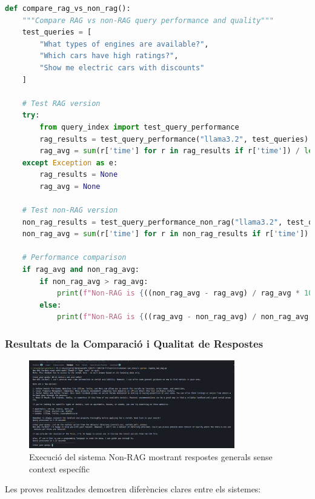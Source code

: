 \documentclass[12pt,a4paper]{article}
\begin{document}
\begin{lstlisting}[language=Python,caption=Funció de comparació automàtica]
def compare_rag_vs_non_rag():
    """Compare RAG vs non-RAG query performance and quality"""
    test_queries = [
        "What types of engines are available?",
        "Which cars have high ratings?",
        "Show me electric cars with discounts"
    ]
    
    # Test RAG version
    try:
        from query_index import test_query_performance
        rag_results = test_query_performance("llama3.2", test_queries)
        rag_avg = sum(r['time'] for r in rag_results if r['time']) / len([r for r in rag_results if r['time']])
    except Exception as e:
        rag_results = None
        rag_avg = None
    
    # Test non-RAG version
    non_rag_results = test_query_performance_non_rag("llama3.2", test_queries)
    non_rag_avg = sum(r['time'] for r in non_rag_results if r['time']) / len([r for r in non_rag_results if r['time']])
    
    # Performance comparison
    if rag_avg and non_rag_avg:
        if non_rag_avg > rag_avg:
            print(f"Non-RAG is {((non_rag_avg - rag_avg) / rag_avg * 100):.1f}% slower than RAG")
        else:
            print(f"Non-RAG is {((rag_avg - non_rag_avg) / non_rag_avg * 100):.1f}% faster than RAG")
\end{lstlisting}

\subsubsection{Resultats de la Comparació i Qualitat de Respostes}

\begin{figure}[H]
\centering
\includegraphics[width=0.8\textwidth]{img/query_non_rag.png}
\caption{Execució del sistema Non-RAG mostrant respostes generals sense context específic}
\end{figure}

Les proves realitzades demostren diferències clares entre els sistemes:
\end{document}
